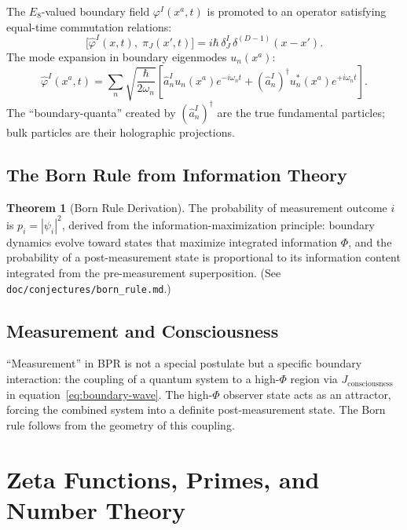 \documentclass[12pt,oneside]{book}
\theoremstyle{definition}
\newtheorem{theorem}{Theorem}[chapter]
\newcommand{\EEight}{E_8}
\begin{document}
The $\EEight$-valued boundary field $\varphi^I(x^a, t)$ is promoted to an operator
satisfying equal-time commutation relations:
\begin{equation}
  \bigl[\hat{\varphi}^I(x,t),\;\hat{\pi}_J(x',t)\bigr]
  = i\hbar\,\delta^I_J\,\delta^{(D-1)}(x - x').
\end{equation}
The mode expansion in boundary eigenmodes $u_n(x^a)$:
\begin{equation}
  \hat{\varphi}^I(x^a, t)
  = \sum_n\sqrt{\frac{\hbar}{2\omega_n}}\left[
      \hat{a}^I_n u_n(x^a)e^{-i\omega_n t}
      + (\hat{a}^I_n)^\dagger u^*_n(x^a)e^{+i\omega_n t}
    \right].
\end{equation}
The ``boundary-quanta'' created by $(\hat{a}^I_n)^\dagger$ are the true fundamental
particles; bulk particles are their holographic projections.

\section{The Born Rule from Information Theory}

\begin{theorem}[Born Rule Derivation]
  The probability of measurement outcome $i$ is
  $p_i = |\psi_i|^2$, derived from the information-maximization principle:
  boundary dynamics evolve toward states that maximize integrated information
  $\Phi$, and the probability of a post-measurement state is proportional to
  its information content integrated from the pre-measurement superposition.
  (See \texttt{doc/conjectures/born\_rule.md}.)
\end{theorem}

\section{Measurement and Consciousness}

``Measurement'' in BPR is not a special postulate but a specific boundary
interaction: the coupling of a quantum system to a high-$\Phi$ region via
$J_{\mathrm{consciousness}}$ in equation~\eqref{eq:boundary-wave}. The high-$\Phi$
observer state acts as an attractor, forcing the combined system into a definite
post-measurement state. The Born rule follows from the geometry of this coupling.

\chapter{Zeta Functions, Primes, and Number Theory}
\label{chap:zeta}
\end{document}
